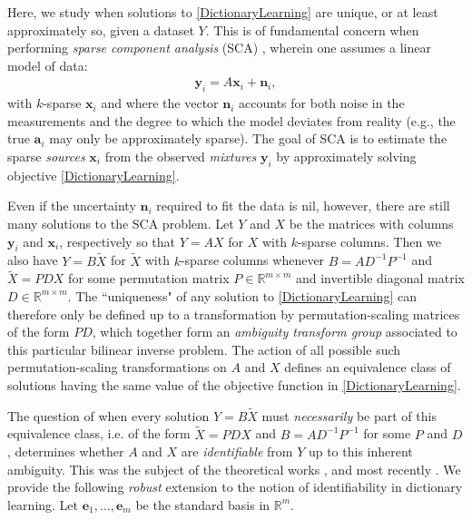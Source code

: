 \documentclass[journal, onecolumn]{IEEEtran}
\begin{document}
Here, we study when solutions to \eqref{DictionaryLearning} are unique, or at least approximately so, given a dataset $Y$. This is of fundamental concern when performing \emph{sparse component analysis} (SCA) \cite{Georgiev05}, wherein one assumes a linear model of data:
\begin{align}\label{LinearModel}
\mathbf{y}_i = A\mathbf{x}_i + \mathbf{n}_i,
\end{align}
with $k$-sparse $\mathbf{x}_i$ and where the vector $\mathbf{n}_i$ accounts for both noise in the measurements and the degree to which the model deviates from reality (e.g., the true $\mathbf{a}_i$ may only be approximately sparse). The goal of SCA is to estimate the sparse \emph{sources} $\mathbf{x}_i$ from the observed \emph{mixtures} $\mathbf{y}_i$ by approximately solving objective \eqref{DictionaryLearning}.

Even if the uncertainty $\mathbf{n}_i$ required to fit the data is nil, however, there are still many solutions to the SCA problem. Let $Y$ and $X$ be the matrices with columns $\mathbf{y}_i$ and $\mathbf{x}_i$, respectively so that $Y = AX$ for $X$ with $k$-sparse columns. Then we also have $Y = B\tilde{X}$ for $\tilde{X}$ with $k$-sparse columns whenever $B = AD^{-1}P^{-1}$ and $\tilde{X} = PDX$ for some permutation matrix $P \in \mathbb{R}^{m \times m}$ and invertible diagonal matrix $D \in \mathbb{R}^{m \times m}$. The ``uniqueness" of any solution to \eqref{DictionaryLearning} can therefore only be defined up to a transformation by permutation-scaling matrices of the form $PD$, which together form an \emph{ambiguity transform group} \cite{?} associated to this particular bilinear inverse problem. The action of all possible such permutation-scaling transformations on $A$ and $X$ defines an equivalence class of solutions having the same value of the objective function in \eqref{DictionaryLearning}. 

The question of when every solution $Y = B\tilde{X}$ must \emph{necessarily} be part of this equivalence class, i.e. of the form $\tilde{X} = PDX$ and $B = AD^{-1}P^{-1}$ for some $P$ and $D$, determines whether $A$ and $X$ are \emph{identifiable} from $Y$ up to this inherent ambiguity. This was the subject of the theoretical works \cite{Georgiev05, Aharon06}, and most recently \cite{Hillar15}. We provide the following \emph{robust} extension to the notion of identifiability in dictionary learning. Let $\mathbf{e}_1, \ldots, \mathbf{e}_m$ be the standard basis in $\mathbb{R}^m$. 
\end{document}
